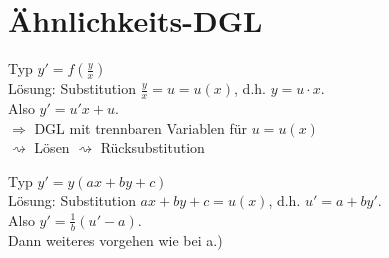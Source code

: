 \section{Ähnlichkeits-DGL}
\begin{anumerate}
\item Typ $\boxed{y'=f\left(\frac{y}{x}\right)}$\\
Lösung: Substitution $\frac{y}{x}=u=u(x)$, d.h. $y=u\cdot x$.\\
Also $y'=u'x+u$.\\
$\Rightarrow $ DGL mit trennbaren Variablen für $u=u(x)$\\
$\rightsquigarrow$ Lösen $\rightsquigarrow$ Rücksubstitution
\item Typ $\boxed{y'=y(ax+by+c)}$\\
Lösung: Substitution $ax+by+c=u(x)$, d.h. $u'=a+by'$.\\
Also $y'=\frac{1}{b}(u'-a)$.\\
Dann weiteres vorgehen wie bei a.)
\end{anumerate}










